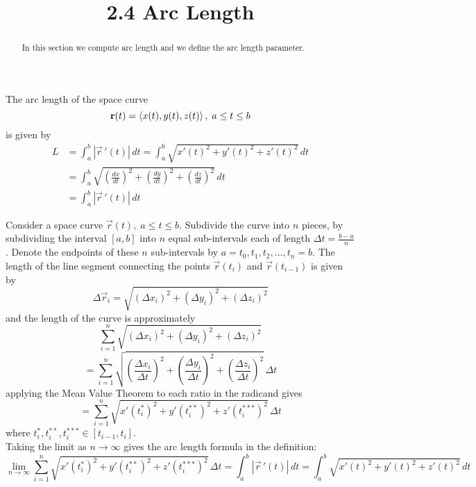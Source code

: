 \documentclass[handout]{ximera}
\title{2.4 Arc Length}
\begin{document}
\begin{abstract}
In this section we compute arc length and we define the arc length parameter.
\end{abstract}

\maketitle


\begin{definition}
The arc length of the space curve
\[
\mathbf r(t) = \left\langle x(t), y(t), z(t)\right\rangle, \; a \leq t \leq b
\]
is given by
\begin{align*}
L &= \int_a^b |\vec r\,'(t)|\, dt = \int_a^b \sqrt{x'(t)^2 + y'(t)^2 +z'(t)^2}\, dt \\
&= \int_a^b \sqrt{\left(\frac{dx}{dt}\right)^2 + \left(\frac{dy}{dt}\right)^2 +\left(\frac{dz}{dt}\right)^2}\, dt\\
&= \int_a^b |\vec r\,'(t)| \, dt
\end{align*}

\end{definition}


Consider a space curve $\vec r(t), \; a \leq t \leq b$.  Subdivide the curve into $n$ pieces, by subdividing the interval $[a, b]$ into $n$ equal 
sub-intervals each of length $\Delta t = \frac{b-a}{n}$. Denote the endpoints of these $n$ sub-intervals by $a = t_0, t_1, t_2, ..., t_n = b$.
The length of the line segment connecting the points $\vec r(t_i)$ and $\vec r(t_{i-1})$ is given by
\[
\Delta \vec r_i = \sqrt{(\Delta x_i) ^2 + (\Delta y_i)^2 + (\Delta z_i)^2}
\]
and the length of the curve is approximately
\[
\sum_{i = 1}^n \sqrt{(\Delta x_i) ^2 + (\Delta y_i)^2 + (\Delta z_i)^2}
\]
\[
= \sum_{i = 1}^n \sqrt{\left(\frac{\Delta x_i}{\Delta t}\right)^2 + \left(\frac{\Delta y_i}{\Delta t}\right)^2 + \left(\frac{\Delta z_i}{\Delta t}\right)^2}\, \Delta t
\]
applying the Mean Value Theorem to each ratio in the radicand gives
\[
= \sum_{i = 1}^n \sqrt{x'(t_i^*)^2 + y'(t_i^{**})^2 + z'(t_i^{***})^2} \,\Delta t
\]
where $t_i^*, t_i^{**}, t_i^{***} \in [t_{i-1}, t_i]$.\\
Taking the limit as $n \to \infty$ gives the arc length formula in the definition:
\[
\lim_{n \to \infty} \sum_{i = 1}^n \sqrt{x'(t_i^*)^2 + y'(t_i^{**})^2 + z'(t_i^{***})^2} \,\Delta t = \int_a^b |\vec r\,'(t)|\, dt = \int_a^b \sqrt{x'(t)^2 + y'(t)^2 +z'(t)^2}\, dt
\]
\end{document}
